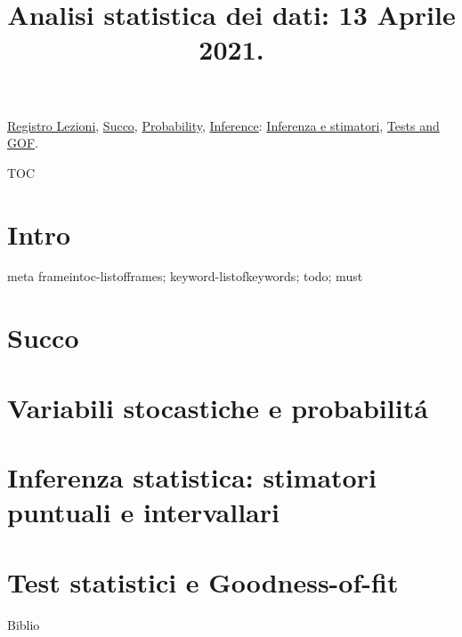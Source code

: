 \documentclass[t,10pt,xcolor={usenames},fleqn]{beamer}
\title{Analisi statistica dei dati: 13 Aprile 2021.}
\begin{document}
\setcounter{tocdepth}{2}

\begin{frame}
  \titlepage
  \hyperlink{reg}{Registro Lezioni}, \hyperlink{succo}{Succo}, \hyperlink{statdistro}{Probability}, \hyperlink{inference}{Inference}: \hyperlink{inferenceparadigm}{Inferenza e stimatori}, \hyperlink{testgof}{Tests and GOF}.
\end{frame}

\begin{frame}{TOC}
\tableofcontents[onlyparts]
\listofframes
\end{frame}

\part{Intro}%
\begin{frame}{meta}
frameintoc-listofframes; keyword-listofkeywords; todo; must
\end{frame}



\part{Succo}%


\part{Variabili stocastiche e probabilit\'a}%


\part{Inferenza statistica: stimatori puntuali e intervallari}%


\part{Test statistici e Goodness-of-fit}%


\begin{frame}{Biblio}
    \printbibliography
\end{frame}
\end{document}
